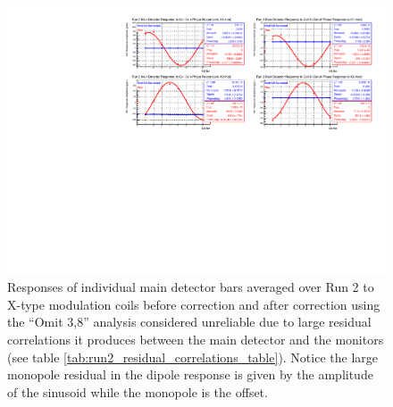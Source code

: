 \begin{landscape}
\begin{figure}[!ht]
\begin{center}
\includegraphics[width=9in]{./Pictures/Run2_X_dipoleOmit3_8.pdf}
\caption{\label{fig:Run2_Omit38_Edipoles}Responses of individual main detector bars averaged over Run 2 to X-type modulation coils before correction and after correction using the ``Omit 3,8'' analysis considered unreliable due to large residual correlations it produces between the main detector and the monitors (see table \ref{tab:run2_residual_correlations_table}). Notice the large monopole residual in the dipole response is given by the amplitude of the sinusoid while the monopole is the offset.}
\end{center}
\end{figure}
\end{landscape}
